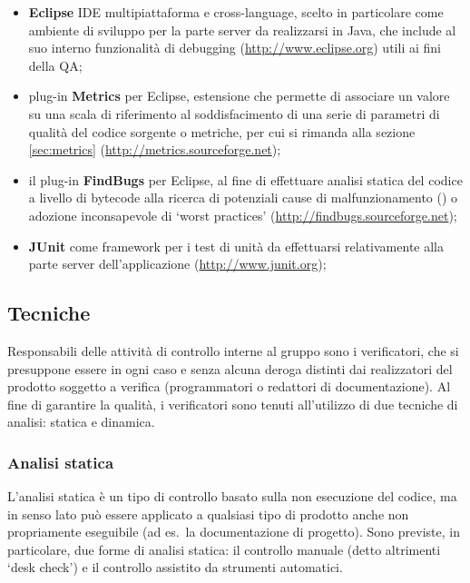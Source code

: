 \begin{itemize}
  \item \textbf{Eclipse} IDE multipiattaforma e cross-language, scelto in particolare come ambiente di sviluppo per la parte server da realizzarsi in Java, che include al suo interno funzionalità di debugging (\url{http://www.eclipse.org}) utili ai fini della QA;
  \item plug-in \textbf{Metrics} per Eclipse, estensione che permette di associare un valore su una scala di riferimento al soddisfacimento di una serie di parametri di qualità del codice sorgente o metriche, per cui si rimanda alla sezione \ref{sec:metrics} (\url{http://metrics.sourceforge.net});
  \item il plug-in \textbf{FindBugs} per Eclipse, al fine di effettuare analisi statica del codice a livello di bytecode alla ricerca di potenziali cause di malfunzionamento () o adozione inconsapevole di `worst practices' (\url{http://findbugs.sourceforge.net});
  \item \textbf{JUnit} come framework per i test di unità da effettuarsi relativamente alla parte server dell'applicazione (\url{http://www.junit.org});
\end{itemize}

\subsection{Tecniche}
Responsabili delle attività di controllo interne al gruppo sono i verificatori, che si presuppone essere in ogni caso e senza alcuna deroga distinti dai realizzatori del prodotto soggetto a verifica (programmatori o redattori di documentazione). Al fine di garantire la qualità, i verificatori sono tenuti all'utilizzo di due tecniche di analisi: statica e dinamica.

\subsubsection{Analisi statica}
L'analisi statica è un tipo di controllo basato sulla non esecuzione del codice, ma in senso lato può essere applicato a qualsiasi tipo di prodotto anche non propriamente eseguibile (ad es.~la documentazione di progetto). Sono previste, in particolare, due forme di analisi statica: il controllo manuale (detto altrimenti `desk check') e il controllo assistito da strumenti automatici.

